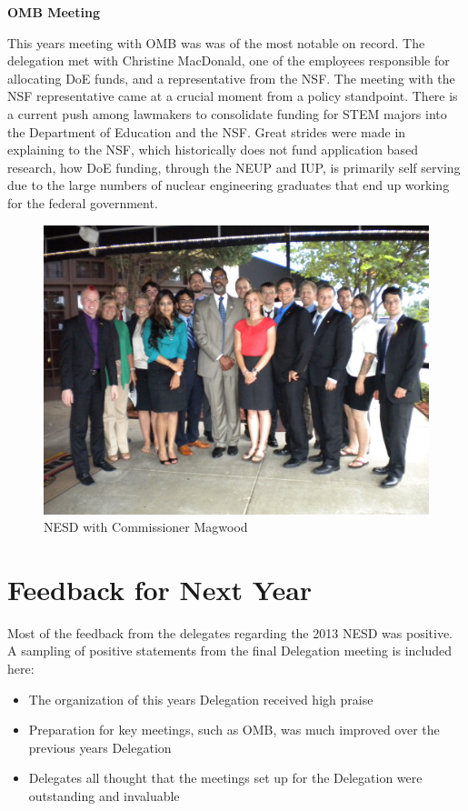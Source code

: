 \documentclass[12pt]{article}
\begin{document}
\textbf{OMB Meeting}

This years meeting with OMB was was of the most notable on record. The
delegation met with Christine MacDonald, one of the employees responsible for
allocating DoE funds, and a representative from the NSF. The meeting with the
NSF representative came at a crucial moment from a policy standpoint. There is a
current push among lawmakers to consolidate funding for STEM majors into the
Department of Education and the NSF. Great strides were made in explaining to
the NSF, which historically does not fund application based research, how DoE
funding, through the NEUP and IUP, is primarily self serving due to the large
numbers of nuclear engineering graduates that end up working for the federal
government.

\begin{figure}[hbtp]
\centering
\captionsetup[figure]{labelformat=empty}
\caption{NESD with Commissioner Magwood}
\includegraphics[scale=.4]{NESD_Mag.jpg} 
\end{figure}


\newpage
\section{Feedback for Next Year}

Most of the feedback from the delegates regarding the 2013 NESD was positive.  A
sampling of positive statements from the final Delegation meeting is included
here:

\begin{itemize}
\item The organization of this years Delegation received high praise
\item Preparation for key meetings, such as OMB, was much improved over the
  previous years Delegation
\item Delegates all thought that the meetings set up for the Delegation were
  outstanding and invaluable
\end{itemize}
\end{document}
